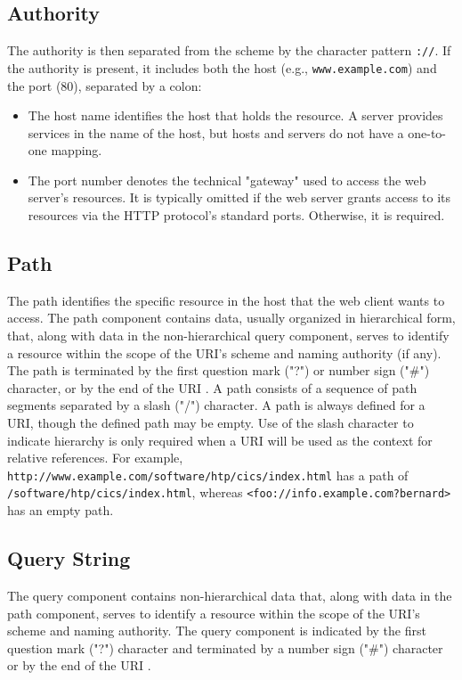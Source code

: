 \subsection*{Authority}
The authority is then separated from the scheme by the character pattern \texttt{://}. If the authority is present, it includes both the host (e.g., \texttt{www.example.com}) and the port (80), separated by a colon:

\begin{itemize}
  \item The host name identifies the host that holds the resource. A server provides services in the name of the host, but hosts and servers do not have a one-to-one mapping.
  \item The port number denotes the technical "gateway" used to access the web server's resources. It is typically omitted if the web server grants access to its resources via the HTTP protocol's standard ports. Otherwise, it is required.
\end{itemize}

\subsection*{Path}
The path identifies the specific resource in the host that the web client wants to access. The path component contains data, usually organized in hierarchical form, that, along with data in the non-hierarchical query component, serves to identify a resource within the scope of the URI's scheme and naming authority (if any).  The path is terminated by the first question mark ("?") or number sign ("\#") character, or by the end of the URI \autocite{berners2005uniform}. A path consists of a sequence of path segments separated by a slash ("/") character.  A path is always defined for a URI, though the defined path may be empty.  Use of the slash character to indicate hierarchy is only required when a URI will be used as the context for relative references.  For example, \texttt{http://www.example.com/software/htp/cics/index.html} has a path of \texttt{/software/htp/cics/index.html}, whereas \texttt{<foo://info.example.com?bernard>} has an empty path.

\subsection*{Query String}
The query component contains non-hierarchical data that, along with data in the path component, serves to identify a resource within the scope of the URI's scheme and naming authority.  The query component is indicated by the first question mark ("?") character and terminated by a number sign ("\#") character or by the end of the URI \autocite{berners2005uniform}.

